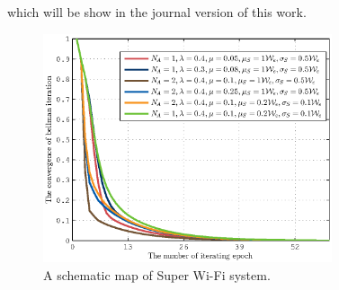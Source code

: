 \documentclass[conference]{IEEEtran}
\begin{document}
which will be show in the journal version of this work.
\begin{figure}
\centering
\includegraphics[width=8.5cm]{2_fig3.eps}
\caption{A schematic map of Super Wi-Fi system.}
\end{figure}
\end{document}
